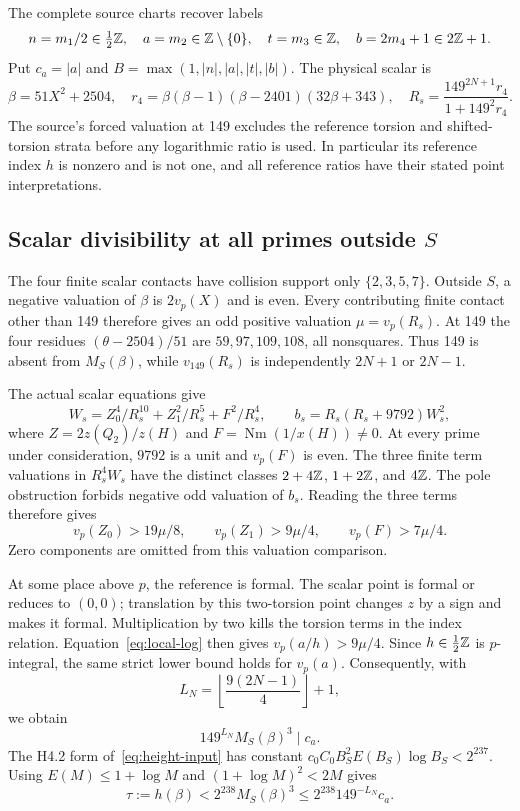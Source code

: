 \documentclass[11pt,a4paper]{article}
\begin{document}
The complete source charts recover labels
\[
 n=m_1/2\in\tfrac12\mathbb Z,\quad a=m_2\in\mathbb Z\setminus\{0\},
 \quad t=m_3\in\mathbb Z,\quad b=2m_4+1\in2\mathbb Z+1.
\]
Put $c_a=|a|$ and $B=\max(1,|n|,|a|,|t|,|b|)$.
The physical scalar is
\[
 \beta=51X^2+2504,\quad
 r_4=\beta(\beta-1)(\beta-2401)(32\beta+343),\quad
 R_s=\frac{149^{2N+1}r_4}{1+149^2r_4}.
\]
The source's forced valuation at 149 excludes the reference torsion
and shifted-torsion strata before any logarithmic ratio is used.
In particular its reference index $h$ is nonzero and is not one,
and all reference ratios have their stated point interpretations.

\subsection{Scalar divisibility at all primes outside \texorpdfstring{$S$}{S}}

The four finite scalar contacts have collision support only
$\{2,3,5,7\}$. Outside $S$, a negative valuation of $\beta$
is $2v_p(X)$ and is even. Every contributing finite contact other
than 149 therefore gives an odd positive valuation
$\mu=v_p(R_s)$. At 149 the four residues
$(\theta-2504)/51$ are $59,97,109,108$, all nonsquares.
Thus 149 is absent from $M_S(\beta)$, while
$v_{149}(R_s)$ is independently $2N+1$ or $2N-1$.

The actual scalar equations give
\[
 W_s=Z_0^4/R_s^{10}+Z_1^2/R_s^5+F^2/R_s^4,
 \qquad b_s=R_s(R_s+9792)W_s^2,
\]
where $Z=2z(Q_2)/z(H)$ and $F=\operatorname{Nm}(1/x(H))\ne0$.
At every prime under consideration, $9792$ is a unit and $v_p(F)$
is even. The three finite term valuations in $R_s^4W_s$ have the
distinct classes $2+4\mathbb Z$, $1+2\mathbb Z$, and $4\mathbb Z$.
The pole obstruction forbids negative odd valuation of $b_s$.
Reading the three terms therefore gives
\[
 v_p(Z_0)>19\mu/8,\qquad v_p(Z_1)>9\mu/4,
 \qquad v_p(F)>7\mu/4.
\]
Zero components are omitted from this valuation comparison.

At some place above $p$, the reference is formal. The scalar point
is formal or reduces to $(0,0)$; translation by this two-torsion
point changes $z$ by a sign and makes it formal.
Multiplication by two kills the torsion terms in the index relation.
Equation~\eqref{eq:local-log} then gives
$v_p(a/h)>9\mu/4$. Since $h\in\tfrac12\mathbb Z$ is $p$-integral,
the same strict lower bound holds for $v_p(a)$.
Consequently, with
\[
 L_N=\left\lfloor\frac{9(2N-1)}4\right\rfloor+1,
\]
we obtain
\begin{equation}\label{eq:scalar-div}
              149^{L_N}M_S(\beta)^3\mid c_a.
\end{equation}
The H4.2 form of~\eqref{eq:height-input} has constant
$c_0C_0B_S^2E(B_S)\log B_S<2^{237}$.
Using $E(M)\le1+\log M$ and $(1+\log M)^2<2M$ gives
\begin{equation}\label{eq:scalar-height}
 \tau:=h(\beta)<2^{238}M_S(\beta)^3
                    \le2^{238}149^{-L_N}c_a.
\end{equation}
\end{document}
